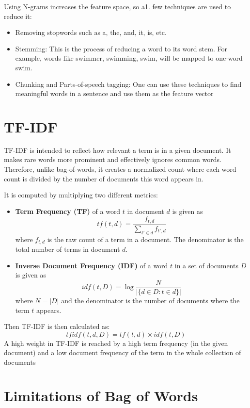 \documentclass[
]{book}
\providecommand{\tightlist}{%
  \setlength{\itemsep}{0pt}\setlength{\parskip}{0pt}}
\begin{document}
Using N-grams increases the feature space, so a1. few techniques are used to reduce it:

\begin{itemize}
\tightlist
\item
  Removing stopwords such as a, the, and, it, is, etc.
\item
  Stemming: This is the process of reducing a word to its word stem. For example, words like swimmer, swimming, swim, will be mapped to one-word swim.
\item
  Chunking and Parts-of-speech tagging: One can use these techniques to find meaningful words in a sentence and use them as the feature vector
\end{itemize}

\hypertarget{tf-idf}{%
\section{TF-IDF}\label{tf-idf}}

TF-IDF is intended to reflect how relevant a term is in a given document. It makes rare words more prominent and effectively ignores common words. Therefore, unlike bag-of-words, it creates a normalized count where each word count is divided by the number of documents this word appears in.

It is computed by multiplying two different metrics:

\begin{itemize}
\item
  \textbf{Term Frequency (TF)} of a word \(t\) in document \(d\) is given as
  \[
  tf(t,d) = \frac{f_{t,d}}{\sum_{t'\in d} f_{t',d}}
  \]
  where \(f_{t,d}\) is the raw count of a term in a document. The denominator is the total number of terms in document \(d\).
\item
  \textbf{Inverse Document Frequency (IDF)} of a word \(t\) in a set of documents \(D\) is given as
  \[
  idf(t,D) = \log\frac{N}{|\{d\in D:t\in d\}|}
  \]
  where \(N=|D|\) and the denominator is the number of documents where the term \(t\) appears.
\end{itemize}

Then TF-IDF is then calculated as:
\[
tfidf(t,d,D) = tf(t,d)\times idf(t,D)
\]
A high weight in TF-IDF is reached by a high term frequency (in the given document) and a low document frequency of the term in the whole collection of documents

\hypertarget{limitations-of-bag-of-words}{%
\section{Limitations of Bag of Words}\label{limitations-of-bag-of-words}}
\end{document}
